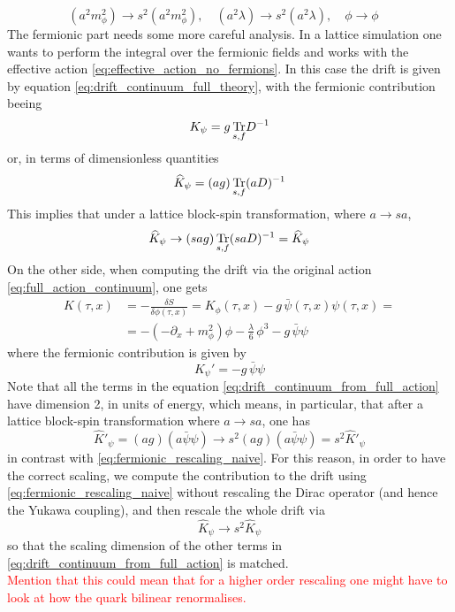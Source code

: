 \begin{equation*}
    (a^2m_\phi^2) \to s^2(a^2m_\phi^2), \quad (a^2\lambda) \to s^2 (a^2\lambda), \quad \phi \to \phi \quad
\end{equation*}
The fermionic part needs some more careful analysis. 
In a lattice simulation one wants to perform the integral over the fermionic fields and works with the effective action \eqref{eq:effective_action_no_fermions}. In this case the drift is given by equation \eqref{eq:drift_continuum_full_theory}, with the fermionic contribution beeing
\begin{equation*}
    K_{\psi} = g \, \underset{s,f}{\operatorname{\text{Tr}}}{D^{-1}}
\end{equation*}
or, in terms of dimensionless quantities
\begin{equation*}
    \widehat{K}_{\psi} = (ag) \, \underset{s,f}{\operatorname{\text{Tr}}}{(aD)^{-1}}
\end{equation*}
This implies that under a lattice block-spin transformation, where $a \to sa$,
\begin{equation}
    \widehat{K}_{\psi} \to  (sag) \, \underset{s,f}{\operatorname{\text{Tr}}}{(saD)^{-1}} = \widehat{K}_{\psi}
    \label{eq:fermionic_rescaling_naive}
\end{equation}
On the other side, when computing the drift via the original action \eqref{eq:full_action_continuum}, one gets
\begin{equation}
    \begin{aligned}
        K(\tau, x) &= - \frac{\delta S}{\delta \phi(\tau, x)} = K_\phi(\tau, x) - g \, \bar\psi(\tau, x)\psi(\tau,x) = \\
        &= -\left(-\partial_x + m_\phi^2\right) \phi - \frac{\lambda}{6} \, \phi^3 - g \, \bar\psi\psi
    \end{aligned}
    \label{eq:drift_continuum_from_full_action}
\end{equation}
where the fermionic contribution is given by
\begin{equation*}
    K_{\psi}' = - g \, \bar\psi\psi
\end{equation*}
Note that all the terms in the equation \eqref{eq:drift_continuum_from_full_action} have dimension 2, in units of energy, which means, in particular, that after a lattice block-spin transformation where $a \to sa$, one has
\begin{equation}
    \widehat{K}'_\psi = (ag) (a\bar\psi \psi) \to s^2 (ag) (a\bar\psi \psi) = s^2 \widehat{K}'_\psi
    \label{eq:rescaling_blinear}
\end{equation}
in contrast with \eqref{eq:fermionic_rescaling_naive}. For this reason, in order to have the correct scaling, we compute the contribution to the drift using \eqref{eq:fermionic_rescaling_naive} without rescaling the Dirac operator (and hence the Yukawa coupling), and then rescale the whole drift via 
\begin{equation*}
    \widehat{K}_\psi \to s^2 \widehat{K}_\psi
\end{equation*}
so that the scaling dimension of the other terms in \eqref{eq:drift_continuum_from_full_action} is matched. \\
\textcolor{red}{Mention that this could mean that for a higher order rescaling one might have to look at how the quark bilinear renormalises.}

\newpage 